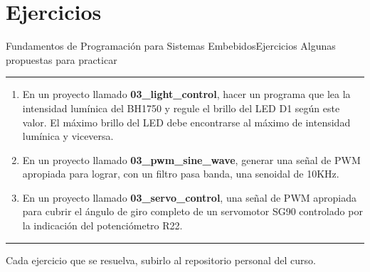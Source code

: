 \documentclass[aspectratio=169, xcolor=dvipsnames]{beamer}
\begin{document}
\section{Ejercicios}
\begin{frame}{Fundamentos de Programación para Sistemas Embebidos}{Ejercicios}
    Algunas propuestas para practicar
    \noindent\rule{\textwidth}{0.75pt}
    \begin{enumerate}
        \item En un proyecto llamado \textbf{03\_light\_control}, hacer un programa que lea la intensidad lumínica del BH1750 y regule el brillo del LED D1 según este valor. El máximo brillo del LED debe encontrarse al máximo de intensidad lumínica y viceversa.
        \item En un proyecto llamado \textbf{03\_pwm\_sine\_wave}, generar una señal de PWM apropiada para lograr, con un filtro pasa banda, una senoidal de 10KHz.
        \item En un proyecto llamado \textbf{03\_servo\_control}, una señal de PWM apropiada para cubrir el ángulo de giro completo de un servomotor SG90 controlado por la indicación del potenciómetro R22.
    \end{enumerate}
    \noindent\rule{\textwidth}{0.75pt}
    Cada ejercicio que se resuelva, subirlo al repositorio personal del curso.
\end{frame}
\end{document}
